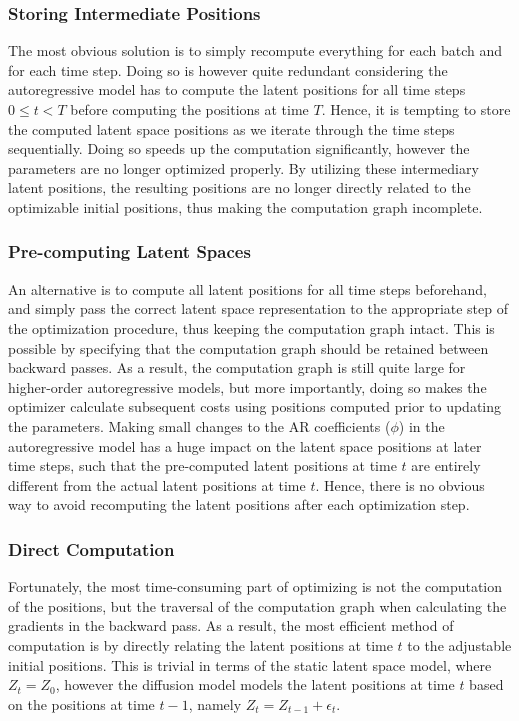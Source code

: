     \subsubsection{Storing Intermediate Positions}
        
        The most obvious solution is to simply recompute everything for each batch and for each time step. Doing so is however quite redundant considering the autoregressive model has to compute the latent positions for all time steps $0\leq t<T$ before computing the positions at time $T$. Hence, it is tempting to store the computed latent space positions as we iterate through the time steps sequentially. Doing so speeds up the computation significantly, however the parameters are no longer optimized properly. By utilizing these intermediary latent positions, the resulting positions are no longer directly related to the optimizable initial positions, thus making the computation graph incomplete.
    
    \subsubsection{Pre-computing Latent Spaces}
        
        An alternative is to compute all latent positions for all time steps beforehand, and simply pass the correct latent space representation to the appropriate step of the optimization procedure, thus keeping the computation graph intact. This is possible by specifying that the computation graph should be retained between backward passes. 
        As a result, the computation graph is still quite large for higher-order autoregressive models, but more importantly, doing so makes the optimizer calculate subsequent costs using positions computed prior to updating the parameters. Making small changes to the AR coefficients ($\phi$) in the autoregressive model has a huge impact on the latent space positions at later time steps, such that the pre-computed latent positions at time $t$ are entirely different from the actual latent positions at time $t$. Hence, there is no obvious way to avoid recomputing the latent positions after each optimization step.
        
    \subsubsection{Direct Computation}
    
        Fortunately, the most time-consuming part of optimizing is not the computation of the positions, but the traversal of the computation graph when calculating the gradients in the backward pass. As a result, the most efficient method of computation is by directly relating the latent positions at time $t$ to the adjustable initial positions. 
        This is trivial in terms of the static latent space model, where $Z_t=Z_0$, however the diffusion model models the latent positions at time $t$ based on the positions at time $t-1$, namely $Z_t=Z_{t-1}+\epsilon_t$.
        
